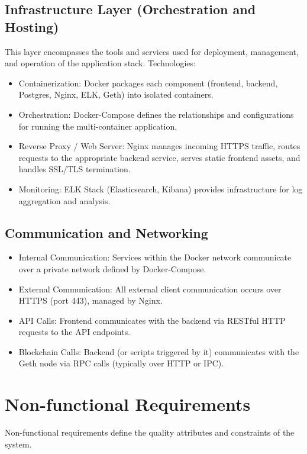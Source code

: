 \subsection*{Infrastructure Layer (Orchestration and Hosting)}
This layer encompasses the tools and services used for deployment, management, and operation of the application stack. Technologies:
\begin{itemize}
    \item Containerization: Docker packages each component (frontend, backend, Postgres, Nginx, ELK, Geth) into isolated containers.
    \item Orchestration: Docker-Compose defines the relationships and configurations for running the multi-container application.
    \item Reverse Proxy / Web Server: Nginx manages incoming HTTPS traffic, routes requests to the appropriate backend service, serves static frontend assets, and handles SSL/TLS termination.
    \item Monitoring: ELK Stack (Elasticsearch, Kibana) provides infrastructure for log aggregation and analysis.
\end{itemize}

\subsection*{Communication and Networking}
\begin{itemize}
    \item Internal Communication: Services within the Docker network communicate over a private network defined by Docker-Compose.
    \item External Communication: All external client communication occurs over HTTPS (port 443), managed by Nginx.
    \item API Calls: Frontend communicates with the backend via RESTful HTTP requests to the API endpoints.
    \item Blockchain Calls: Backend (or scripts triggered by it) communicates with the Geth node via RPC calls (typically over HTTP or IPC).
\end{itemize}

\section{Non-functional Requirements}
Non-functional requirements define the quality attributes and constraints of the system.

